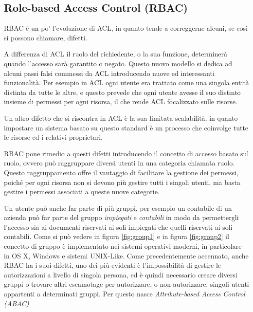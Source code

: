 \subsection*{Role-based Access Control (RBAC)} %
\label{sub:role_based_access_control}

RBAC è un po' l'evoluzione di ACL, in quanto tende a correggerne alcuni, se così si possono chiamare, difetti. \par
A differenza di ACL il ruolo del richiedente, o la sua funzione, determinerà quando l'accesso sarà garantito o negato.
Questo nuovo modello si dedica ad alcuni passi falsi commessi da ACL introducendo nuove ed interessanti funzionalità. Per esempio in ACL ogni utente era trattato come una singola entità distinta da tutte le altre, e questo prevede che ogni utente avesse il suo distinto insieme di permessi per ogni risorsa, il che rende ACL focalizzato sulle risorse. \par
Un altro difetto che si riscontra in ACL è la sua limitata scalabilità, in quanto 
impostare un sistema basato su questo standard è un processo che coinvolge tutte le risorse ed i relativi proprietari.\\ \par
RBAC pone rimedio a questi difetti introducendo il concetto di accesso basato sul ruolo, ovvero può raggruppare diversi utenti in una categoria chiamata ruolo. 
Questo raggruppamento offre il vantaggio di facilitare la gestione dei permessi, poiché per ogni risorsa non si devono più gestire tutti i singoli utenti, ma basta gestire i permessi associati a queste nuove categorie.\\ \par
Un utente può anche far parte di più gruppi, per esempio un contabile di un azienda può far parte del gruppo \textit{impiegati} e \textit{contabili} in modo da permettergli l'accesso sia ai documenti riservati ai soli impiegati che quelli riservati ai soli contabili.
Come si può vedere in figura \ref{fig:group1} e in figura \ref{fig:group2} il concetto di gruppo è implementato nei sistemi operativi moderni, in particolare in OS X, Windows e sistemi UNIX-Like.
Come precedentemente accennato, anche RBAC ha i suoi difetti, uno dei più evidenti è l'impossibilità di gestire le autorizzazioni a livello di singola persona, ed è quindi necessario creare diversi gruppi o trovare altri escamotage per autorizzare, o non autorizzare, singoli utenti appartenti a determinati gruppi. Per questo nasce \textit{Attribute-based Access Control (ABAC)}

